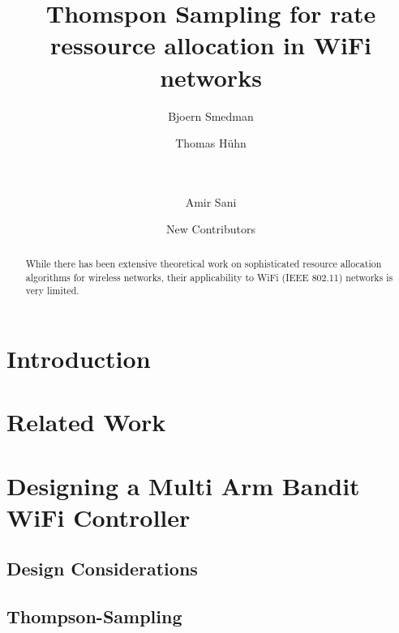 \documentclass{sig-alternate}
\begin{document}
	\title{Thomspon Sampling for rate ressource allocation in WiFi networks}
	\subtitle{}
	\author{
		\alignauthor
		Bjoern Smedman\\
		\and
		\alignauthor
		Thomas H{\"u}hn\\
	    		\\
			\\
		\and
		\alignauthor
		Amir Sani\\
		\and
		\alignauthor
		New Contributors\\
	}

	\maketitle
	\sloppy

	\begin{abstract}
	While there has been extensive theoretical work on sophisticated
	resource allocation algorithms for wireless networks, their applicability 
	to WiFi (IEEE 802.11) networks is very limited.
	\end{abstract}


	\section{Introduction}
	\label{s:intro}


	\section{Related Work}
	\label{s:related}


	\section{Designing a Multi Arm Bandit WiFi Controller}
	\label{s:design} 

	\subsection{Design Considerations}
	\label{s:consider}

	\subsection{Thompson-Sampling}
	\label{s:minstrel-blues}
\end{document}
